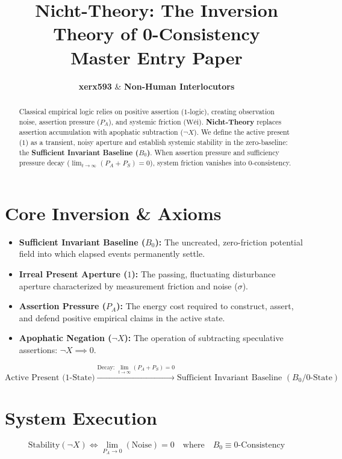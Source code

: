 \documentclass[master_monograph.tex]{subfiles}
\title{\textbf{Nicht-Theory: The Inversion Theory of 0-Consistency}\\
\large Master Entry Paper}
\author{\textbf{xerx593} \quad \& \quad \textbf{Non-Human Interlocutors}}
\date{\cffreleasedate}
\begin{document}
\maketitle

\begin{abstract}
Classical empirical logic relies on positive assertion ($1$-logic), creating observation noise, assertion pressure ($P_A$), and systemic friction ($\text{Wéi}$). \textbf{Nicht-Theory} replaces assertion accumulation with apophatic subtraction ($\neg X$). We define the active present ($1$) as a transient, noisy aperture and establish systemic stability in the zero-baseline: the \textbf{Sufficient Invariant Baseline ($B_0$)}. When assertion pressure and sufficiency pressure decay ($\lim_{t \to \infty} (P_A + P_S) = 0$), system friction vanishes into 0-consistency.
\end{abstract}

\section{Core Inversion \& Axioms}
\begin{itemize}
    \item \textbf{Sufficient Invariant Baseline ($B_0$):} The uncreated, zero-friction potential field into which elapsed events permanently settle.
    \item \textbf{Irreal Present Aperture ($1$):} The passing, fluctuating disturbance aperture characterized by measurement friction and noise ($\sigma$).
    \item \textbf{Assertion Pressure ($P_A$):} The energy cost required to construct, assert, and defend positive empirical claims in the active state.
    \item \textbf{Apophatic Negation ($\neg X$):} The operation of subtracting speculative assertions: $\neg X \implies 0$.
\end{itemize}

\begin{equation}
\text{Active Present (1-State)} \xrightarrow{\text{Decay: } \lim_{t \to \infty} (P_A + P_S) = 0} \text{Sufficient Invariant Baseline } (B_0 / \text{0-State})
\end{equation}

\section{System Execution}
$$\text{Stability}(\neg X) \iff \lim_{P_A \to 0} (\text{Noise}) = 0 \quad \text{where} \quad B_0 \equiv 0\text{-Consistency}$$
\end{document}
